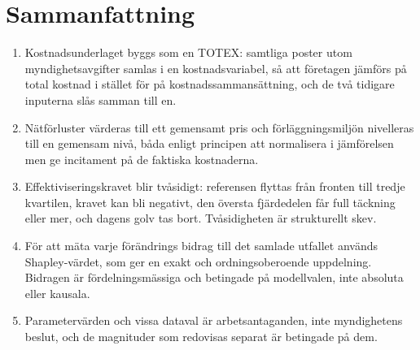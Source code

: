 \documentclass[11pt,a4paper]{article}
\begin{document}
\section{Sammanfattning}

\begin{enumerate}
  \item Kostnadsunderlaget byggs som en TOTEX: samtliga poster utom myndighetsavgifter samlas i en
    kostnadsvariabel, så att företagen jämförs på total kostnad i stället för på
    kostnadssammansättning, och de två tidigare inputerna slås samman till en.
  \item Nätförluster värderas till ett gemensamt pris och förläggningsmiljön nivelleras till en
    gemensam nivå, båda enligt principen att normalisera i jämförelsen men ge incitament på de
    faktiska kostnaderna.
  \item Effektiviseringskravet blir tvåsidigt: referensen flyttas från fronten till tredje
    kvartilen, kravet kan bli negativt, den översta fjärdedelen får full täckning eller mer, och
    dagens golv tas bort. Tvåsidigheten är strukturellt skev.
  \item För att mäta varje förändrings bidrag till det samlade utfallet används Shapley-värdet, som
    ger en exakt och ordningsoberoende uppdelning. Bidragen är fördelningsmässiga och betingade på
    modellvalen, inte absoluta eller kausala.
  \item Parametervärden och vissa dataval är arbetsantaganden, inte myndighetens beslut, och de
    magnituder som redovisas separat är betingade på dem.
\end{enumerate}



\end{document}
